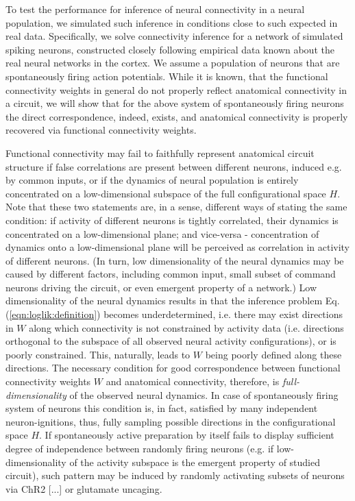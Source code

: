 To test the performance for inference of neural connectivity in a neural population, we simulated such inference in conditions close to such expected in real data.
Specifically, we solve connectivity inference for a network of simulated spiking neurons, constructed closely following empirical data known about the real neural networks in the cortex. We assume a population of neurons that are spontaneously firing action potentials.
While it is known, that the functional connectivity weights in general do not properly reflect anatomical connectivity in a circuit, we will show that for the above system of spontaneously firing neurons the direct correspondence, indeed, exists, and anatomical connectivity is properly recovered via functional connectivity weights.

Functional connectivity may fail to faithfully represent anatomical circuit structure if false correlations are present between different neurons, induced e.g. by common inputs, or if the dynamics of neural population is entirely concentrated on a low-dimensional subspace of the full configurational space $H$. Note that these two statements are, in a sense, different ways of stating the same condition: if activity of different neurons is tightly correlated, their dynamics is concentrated on a low-dimensional plane; and vice-versa - concentration of dynamics onto a low-dimensional plane will be perceived as correlation in activity of different neurons. (In turn, low dimensionality of the neural dynamics may be caused by different factors, including common input, small subset of command neurons driving the circuit, or even emergent property of a network.) Low dimensionality of the neural dynamics results in that the inference problem Eq.(\ref{eqn:loglik:definition}) becomes underdetermined, i.e. there may exist directions in $W$ along which connectivity is not constrained by activity data (i.e. directions orthogonal to the subspace of all observed neural activity configurations), or is poorly constrained. This, naturally, leads to $W$ being poorly defined along these directions. The necessary condition for good correspondence between functional connectivity weights $W$ and anatomical connectivity, therefore, is {\em full-dimensionality} of the observed neural dynamics. In case of spontaneously firing system of neurons this condition is, in fact, satisfied by many independent neuron-ignitions, thus, fully sampling possible directions in the configurational space $H$. If spontaneously active preparation by itself fails to display sufficient degree of independence between randomly firing neurons (e.g. if low-dimensionality of the activity subspace is the emergent property of studied circuit), such pattern may be induced by randomly activating subsets of neurons via ChR2 [...] or glutamate uncaging.

